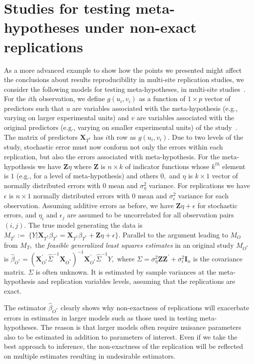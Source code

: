 \documentclass[meta,authordate,issue]{jote-new-article}
\newcommand{\X}{\mathbf{X}}
\newcommand{\Z}{\mathbf{Z}}
\newcounter{result}
\begin{document}
\section{Studies for testing meta-hypotheses under non-exact replications}

As a more advanced example to show how the points we presented might affect the conclusions about results reproducibility in multi-site replication studies, we consider the following models for testing meta-hypotheses, in multi-site studies~\parencite[e.g., author involvement effect tested in Many Labs 4,][]{klein2022many}. For the $i$th observation, we define $g(u_i, v_i)$ as a function of $1 \times p$ vector of predictors such that $u$ are variables associated with the meta-hypothesis (e.g., varying on larger experimental units) and $v$ are variables associated with the original predictors (e.g., varying on smaller experimental units) of the study~\parencite{jones2009split}. The matrix of predictors $\X_{T^*}$ has $i$th row as $g(u_i, v_i).$ Due to two levels of the study, stochastic error must now conform not only the errors within each replication, but also the errors associated with meta-hypothesis. For the meta-hypothesis we have $\Z\eta$ where $\Z$ is $n \times k$ of indicator functions whose $k^{th}$ element is $1$ (e.g., for a level of meta-hypothesis) and others $0,$ and $\eta$ is $k \times 1$ vector of normally distributed errors with 0 mean and $\sigma_{\eta}^2$ variance. For replications we have $\epsilon$ is $n \times 1$ normally distributed errors with 0 mean and $\sigma_{\epsilon}^2$ variance for each observation. Assuming additive errors as before, we have $\Z\eta+\epsilon$ for stochastic errors, and $\eta_i$ and $\epsilon_j$ are assumed to be uncorrelated for all observation pairs $(i,j).$ The true model generating the data is
%
$M_{T^*}:=\; \{Y|\X_{T^*}\beta_{T^*} =\X_{T^*}\beta_{T^*}+\Z\eta+\epsilon\}.
$
%
Parallel to the argument leading to $M_O$ from $M_T,$
the {\em feasible generalized least squares estimates} in an original study $M_{O^*}$ is
%
$
  \hat{\beta}_{O^*} = (\X_{O^*}^{'}\widehat{\Sigma}^{-1}\X_{O^*})^{-1}\X_{O^*}^{'} \widehat{\Sigma}^{-1}Y,
$
%
where
$\Sigma=\sigma_{\eta}^2 \Z \Z^{'}+\sigma_{\epsilon}^2\mathbf{I}_{n}$
is the covariance matrix. $\Sigma$ is often unknown. It is estimated by sample variances at the meta-hypothesis and replication variables levels, assuming that the replications are exact.

The estimator $\hat{\beta}_{O^*}$ clearly shows why non-exactness of replications will exacerbate errors in estimates in larger models such as those used in testing meta-hypotheses. The reason is that larger models often require nuisance parameters also to be estimated in addition to parameters of interest. Even if we take the best approach to inference, the non-exactness of the replication will be reflected on multiple estimates resulting in undesirable estimators.
\end{document}
